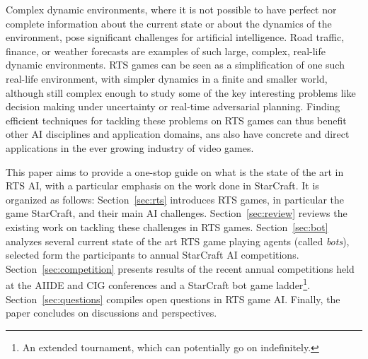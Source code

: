 \documentclass[journal]{IEEEtran}
\begin{document}
Complex dynamic environments, where it is not possible to have perfect nor complete information about the current state or about the dynamics of the environment, pose significant challenges for artificial intelligence. Road  traffic, finance, or
weather  forecasts are  examples of such large, complex, real-life dynamic
environments. RTS games can be seen as a simplification of one such real-life
environment, with simpler dynamics in a  finite and smaller
world, although still complex enough  to study some of the key interesting
problems like decision making  under
uncertainty  or  real-time adversarial planning. Finding efficient  techniques for
tackling  these problems  on  RTS  games can  thus  benefit other AI disciplines and application
domains, ans also have concrete  and direct applications in  the ever growing
industry of  video games.%

This paper aims to provide a one-stop guide on what is the state of
the art in RTS AI, with a particular emphasis on the work done in StarCraft. 
It is organized as follows: Section~\ref{sec:rts}
introduces RTS games, in particular the game StarCraft,
and  their main  AI challenges.  Section~\ref{sec:review}
reviews  the existing  work on tackling these challenges in RTS games.
Section~\ref{sec:bot} analyzes several current state of the art RTS game playing agents (called {\em bots}), selected form the participants to annual
StarCraft    AI    competitions.
Section~\ref{sec:competition}  presents results of the recent annual competitions
held at the AIIDE  and CIG conferences and a StarCraft bot game ladder\footnote{An extended tournament, which can potentially go on indefinitely.}.  Section~\ref{sec:questions}
compiles open questions in RTS game AI. Finally, the paper concludes on discussions and perspectives.


\end{document}
